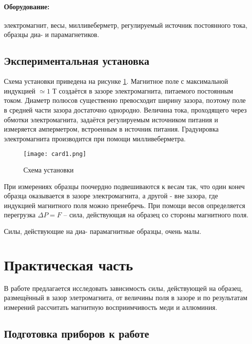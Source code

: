 \documentclass[a4paper,12pt]{article} %
\begin{document}
\paragraph{Оборудование:} электромагнит, весы, милливеберметр, регулируемый источник постоянного тока, образцы диа- и парамагнетиков.

\subsection{Экспериментальная установка}

Схема установки приведена на рисунке \ref{img1}. Магнитное поле с максимальной индукцией $\simeq 1 \text{ Т}$ создаётся в зазоре электромагнита, питаемого постоянным током. Диаметр полюсов существенно превосходит ширину зазора, поэтому поле в средней части зазора достаточно однородно. Величина тока, проходящего через обмотки электромагнита, задаётся регулируемым источником питания и измеряется амперметром, встроенным в источник питания. Градуировка электромагнита производится при помощи милливеберметра.

\begin{figure}[h]
\begin{center}
		\texttt{[image: card1.png]}
\end{center}
	\caption{Схема установки}
	\label{img1}
\end{figure}

При измерениях образцы поочердно подвешиваются к весам так, что один конеч образца оказывается в зазоре электромагнита, а другой - вне зазора, где индукцией магнитного поля можно пренебречь. При помощи весов определяется перегрузка $\Delta P = F$ -- сила, действующая на образец со стороны магнитного поля.

Силы, действующие на диа- парамагнитные образцы, очень малы.

\newpage

\section{Практическая часть}

В работе предлагается исследовать зависимость силы, действующей на образец, размещённый в зазор элетромагнита, от величины поля в зазоре и по результатам измерений рассчитать магнитную восприимчивость меди и аллюминия.

\subsection{Подготовка приборов к работе}
\end{document}
